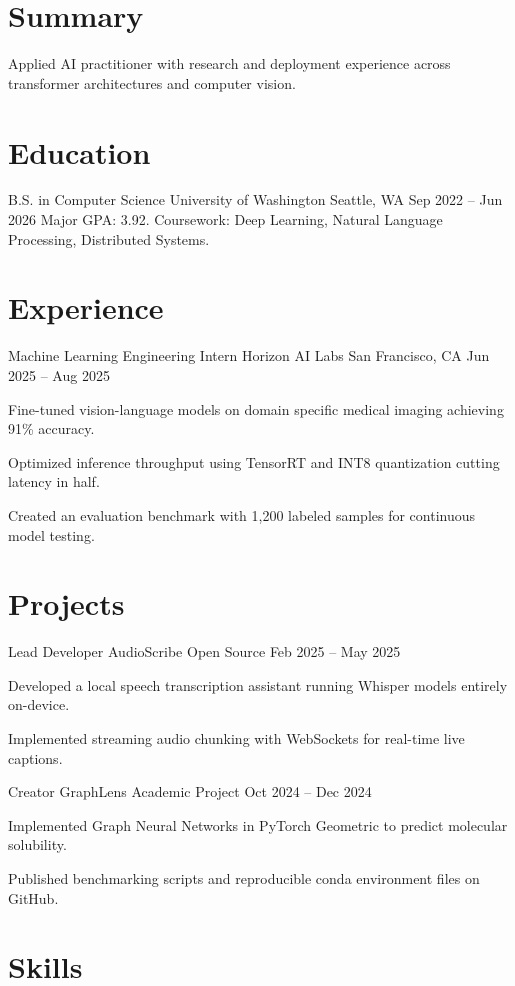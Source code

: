 \documentclass[11pt, a4paper]{awesome-cv}
\begin{document}
\section{Summary}
Applied AI practitioner with research and deployment experience across transformer architectures and computer vision.

\section{Education}
\cventry
  {B.S. in Computer Science}
  {University of Washington}
  {Seattle, WA}
  {Sep 2022 -- Jun 2026}
  {Major GPA: 3.92. Coursework: Deep Learning, Natural Language Processing, Distributed Systems.}

\section{Experience}
\cventry
  {Machine Learning Engineering Intern}
  {Horizon AI Labs}
  {San Francisco, CA}
  {Jun 2025 -- Aug 2025}
  {
    \begin{cvitems}
      \item Fine-tuned vision-language models on domain specific medical imaging achieving 91\% accuracy.
      \item Optimized inference throughput using TensorRT and INT8 quantization cutting latency in half.
      \item Created an evaluation benchmark with 1,200 labeled samples for continuous model testing.
    \end{cvitems}
  }

\section{Projects}
\cventry
  {Lead Developer}
  {AudioScribe}
  {Open Source}
  {Feb 2025 -- May 2025}
  {
    \begin{cvitems}
      \item Developed a local speech transcription assistant running Whisper models entirely on-device.
      \item Implemented streaming audio chunking with WebSockets for real-time live captions.
    \end{cvitems}
  }

\cventry
  {Creator}
  {GraphLens}
  {Academic Project}
  {Oct 2024 -- Dec 2024}
  {
    \begin{cvitems}
      \item Implemented Graph Neural Networks in PyTorch Geometric to predict molecular solubility.
      \item Published benchmarking scripts and reproducible conda environment files on GitHub.
    \end{cvitems}
  }

\section{Skills}
\begin{cvskills}
\end{cvskills}
\end{document}
